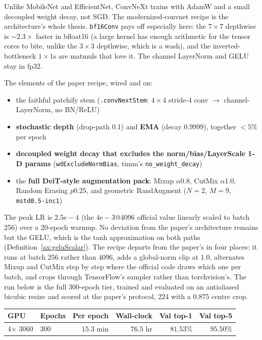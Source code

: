 Unlike MobileNet and EfficientNet, ConvNeXt trains with AdamW and a
small decoupled weight decay, not SGD. The modernized-convnet
recipe is the architecture's whole thesis. \texttt{bf16Conv} pays off
especially here: the $7\times7$ depthwise is $\sim2.3\times$ faster
in bfloat16 (a large kernel has enough arithmetic for the tensor
cores to bite, unlike the $3\times3$ depthwise, which is a wash), and
the inverted-bottleneck $1\times1$s are matmuls that love it. The
channel LayerNorm and GELU stay in fp32.

The elements of the paper recipe, wired and on:

\begin{itemize}
  \item the faithful patchify stem (\texttt{.convNextStem}:
    $4\times4$ stride-4 conv $\to$ channel-LayerNorm, no BN/ReLU)
  \item \textbf{stochastic depth} (drop-path 0.1) and \textbf{EMA}
    (decay 0.9999), together ${<}5\%$ per epoch
  \item \textbf{decoupled weight decay that excludes the
    norm/bias/LayerScale 1-D params} (\texttt{wdExcludeNormBias},
    timm's \texttt{no\_weight\_decay})
  \item the \textbf{full DeiT-style augmentation pack}: Mixup
    $\alpha0.8$, CutMix $\alpha1.0$, Random Erasing $p0.25$, and
    geometric RandAugment ($N{=}2$, $M{=}9$, \texttt{mstd0.5-inc1})
\end{itemize}

\noindent The peak LR is $2.5\mathrm{e}{-}4$ (the
$4\mathrm{e}{-}3$@4096 official value linearly scaled to batch 256)
over a 20-epoch warmup. No deviation from the paper's architecture remains
but the GELU, which is the tanh approximation on both paths
(Definition~\ref{ax:geluScalar}). The recipe departs from the paper's in
four places: it runs at batch $256$ rather than $4096$, adds a global-norm
clip at $1.0$, alternates Mixup and CutMix step by step where the official
code draws which one per batch, and crops through TensorFlow's sampler
rather than torchvision's. The run below is the full 300-epoch tier,
trained and evaluated on an antialiased bicubic resize and scored at the
paper's protocol, $224$ with a $0.875$ centre crop.

\begin{center}
\begin{tabular}{l l r r r r}
\hline
GPU & Epochs & Per epoch & Wall-clock & Val top-1 & Val top-5 \\
\hline
4$\times$ 3060 & 300 & $15.3$ min & $76.5$ hr & $\mathbf{81.53\%}$ & $\mathbf{95.50\%}$ \\
\hline
\end{tabular}
\end{center}

